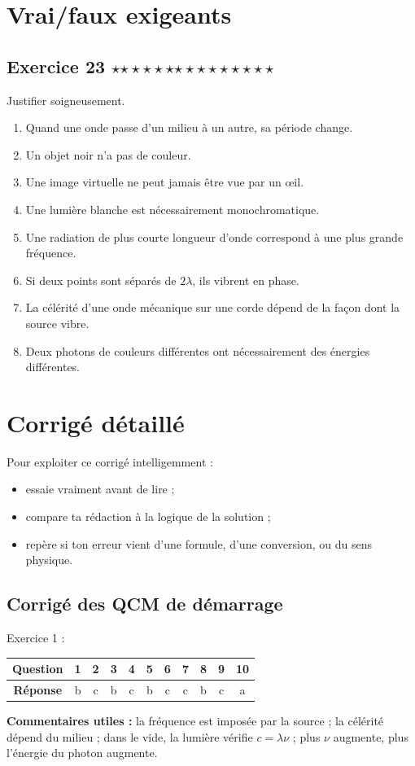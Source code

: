 \documentclass[11pt,a4paper]{article}
\newcommand{\etoiles}[1]{%
\ifcase#1\or $\star$\or $\star\star$\or $\star\star\star$\or $\star\star\star\star$\or $\star\star\star\star\star$\fi}
\newcommand{\exostar}[2]{\subsection*{Exercice #1 \hfill \etoiles{#2}}}
\begin{document}
\section{Vrai/faux exigeants}

\exostar{23}{4}
Justifier soigneusement.
\begin{enumerate}[label=\arabic*.,leftmargin=1cm]
    \item Quand une onde passe d'un milieu à un autre, sa période change.
    \item Un objet noir n'a pas de couleur.
    \item Une image virtuelle ne peut jamais être vue par un œil.
    \item Une lumière blanche est nécessairement monochromatique.
    \item Une radiation de plus courte longueur d'onde correspond à une plus grande fréquence.
    \item Si deux points sont séparés de $2\lambda$, ils vibrent en phase.
    \item La célérité d'une onde mécanique sur une corde dépend de la façon dont la source vibre.
    \item Deux photons de couleurs différentes ont nécessairement des énergies différentes.
\end{enumerate}

\section{Corrigé détaillé}

\begin{methodebox}
Pour exploiter ce corrigé intelligemment :
\begin{itemize}[leftmargin=1.2em]
    \item essaie vraiment avant de lire ;
    \item compare ta rédaction à la logique de la solution ;
    \item repère si ton erreur vient d'une formule, d'une conversion, ou du sens physique.
\end{itemize}
\end{methodebox}

\subsection*{Corrigé des QCM de démarrage}
\begin{corrbox}
Exercice 1 :
\begin{center}
\begin{tabular}{>{\bfseries}c cccccccccc}
\toprule
Question & 1 & 2 & 3 & 4 & 5 & 6 & 7 & 8 & 9 & 10\\
\midrule
Réponse & b & c & b & c & b & c & c & b & c & a\\
\bottomrule
\end{tabular}
\end{center}
\textbf{Commentaires utiles :} la fréquence est imposée par la source ; la célérité dépend du milieu ; dans le vide, la lumière vérifie $c=\lambda\nu$ ; plus $\nu$ augmente, plus l'énergie du photon augmente.
\end{corrbox}
\end{document}

